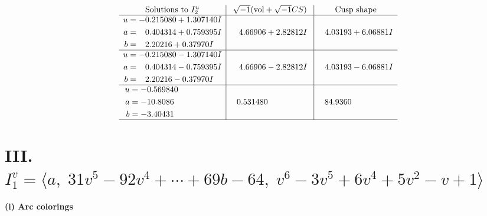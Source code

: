 \documentclass[1p]{elsarticle_modified}
\theoremstyle{definition}
\newcommand{\I}{\sqrt{-1}}
\begin{document}
$$\begin{array}{c|c|c}  
\text{Solutions to }I^u_{2}& \I (\text{vol} + \sqrt{-1}CS) & \text{Cusp shape}\\
 \hline 
\begin{aligned}
u &= -0.215080 + 1.307140 I \\
a &= \phantom{-}0.404314 + 0.759395 I \\
b &= \phantom{-}2.20216 + 0.37970 I\end{aligned}
 & \phantom{-}4.66906 + 2.82812 I & \phantom{-}4.03193 + 6.06881 I \\ \hline\begin{aligned}
u &= -0.215080 - 1.307140 I \\
a &= \phantom{-}0.404314 - 0.759395 I \\
b &= \phantom{-}2.20216 - 0.37970 I\end{aligned}
 & \phantom{-}4.66906 - 2.82812 I & \phantom{-}4.03193 - 6.06881 I \\ \hline\begin{aligned}
u &= -0.569840\phantom{ +0.000000I} \\
a &= -10.8086\phantom{ +0.000000I} \\
b &= -3.40431\phantom{ +0.000000I}\end{aligned}
 & \phantom{-}0.531480\phantom{ +0.000000I} & \phantom{-}84.9360\phantom{ +0.000000I}\\
 \hline 
 \end{array}$$\newpage\newpage\renewcommand{\arraystretch}{1}
\centering \section*{III. $I^v_{1}= \langle a,\;31 v^5-92 v^4+\cdots+69 b-64,\;v^6-3 v^5+6 v^4+5 v^2- v+1 \rangle$}
\flushleft \textbf{(i) Arc colorings}\\
\end{document}
